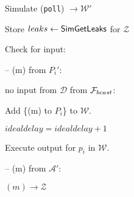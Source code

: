 \begin{bbox}[title={Algorithm $\msf{Poll}$}]

Simulate (\texttt{poll}) $\rightarrow \mathcal{W}'$

Store $leaks \leftarrow {\mathsf {SimGetLeaks}}$ for $\mathcal{Z}$

Check for input:

-- \OnInput (m) from $P_i'$:

	\qquad \If no input from $\mathcal{D}$ from $\mathcal{F}_{bcast}$:

		\qqquad Add \{\Send (m) to $P_i$\} to $\mathcal{W}$.

		\qqquad $idealdelay = idealdelay + 1$

	\qquad Execute output for $p_i$ in $\mathcal{W}$.

-- \OnInput (m) from $\mathcal{A}'$:

	\qquad \Send $(m) \rightarrow \mathcal{Z}$

\end{bbox}

